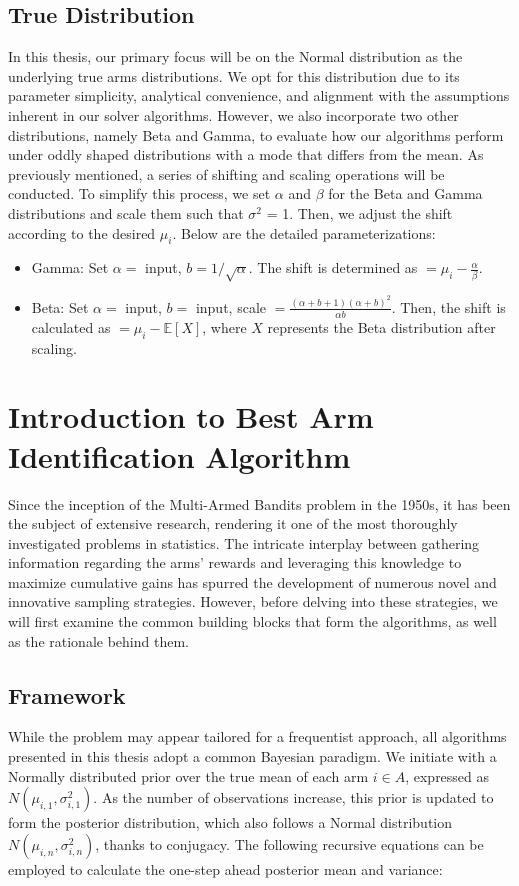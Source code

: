 \documentclass[a4paper, 12pt]{article}
\theoremstyle{definition}
\begin{document}
\subsection{True Distribution}
In this thesis, our primary focus will be on the Normal distribution as the underlying true arms distributions. We opt for this distribution due to its parameter simplicity, analytical convenience, and alignment with the assumptions inherent in our solver algorithms. However, we also incorporate two other distributions, namely Beta and Gamma, to evaluate how our algorithms perform under oddly shaped distributions with a mode that differs from the mean. As previously mentioned, a series of shifting and scaling operations will be conducted. To simplify this process, we set $\alpha$ and $\beta$ for the Beta and Gamma distributions and scale them such that $\sigma^2$ = 1. Then, we adjust the shift according to the desired $\mu_i$. Below are the detailed parameterizations:

\begin{itemize}
    \item Gamma: Set $\alpha =$ input, $b = 1/\sqrt{\alpha}$. The shift is determined as $= \mu_i - \frac{\alpha}{\beta}$.
    \item Beta: Set $\alpha =$ input, $b =$ input, scale $= \frac{(\alpha+b+1)(\alpha+b)^2}{\alpha b}$. Then, the shift is calculated as $= \mu_i-\mathbb{E}[X]$, where $X$ represents the Beta distribution after scaling.
\end{itemize}



\section{Introduction to Best Arm Identification Algorithm} \label{sec:algo_intro}
Since the inception of the Multi-Armed Bandits problem in the 1950s, it has been the subject of extensive research, rendering it one of the most thoroughly investigated problems in statistics. The intricate interplay between gathering information regarding the arms' rewards and leveraging this knowledge to maximize cumulative gains has spurred the development of numerous novel and innovative sampling strategies. However, before delving into these strategies, we will first examine the common building blocks that form the algorithms, as well as the rationale behind them.


\subsection{Framework}
While the problem may appear tailored for a frequentist approach, all algorithms presented in this thesis adopt a common Bayesian paradigm. We initiate with a Normally distributed prior over the true mean of each arm $i\in A$, expressed as $N(\mu_{i,1},\sigma_{i,1}^2)$. As the number of observations increase, this prior is updated to form the posterior distribution, which also follows a Normal distribution $N(\mu_{i,n},\sigma_{i,n}^2)$, thanks to conjugacy. The following recursive equations can be employed to calculate the one-step ahead posterior mean and variance:
\end{document}
